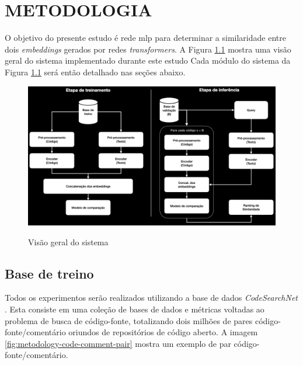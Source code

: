 \chapter{METODOLOGIA}
\label{chp:methodology}
\graphicspath{ {./imagens/metodologia} }

O objetivo do presente estudo é rede \gls{mlp} para determinar a similaridade entre dois \textit{embeddings} gerados por redes \textit{transformers}. A Figura \ref{fig:metodology-system_overview} mostra uma visão geral do sistema implementado durante este estudo Cada módulo do sistema da Figura \ref{fig:metodology-system_overview} será então detalhado nas seções abaixo.

\begin{figure}[H]
    \centering
        \caption{Visão geral do sistema}
        \includegraphics[scale=0.3]{system-overview.png}
        \label{fig:metodology-system_overview}
\end{figure}

\section{Base de treino}
Todos os experimentos serão realizados utilizando a base de dados \textit{CodeSearchNet} \cite{Husain2019CodeSearchNetCE}. Esta consiste em uma coleção de bases de dados e métricas voltadas ao problema de busca de código-fonte, totalizando dois milhões de pares código-fonte/comentário oriundos de repositórios de código aberto. A imagem \ref{fig:metodology-code-comment-pair} mostra um exemplo de par código-fonte/comentário.


